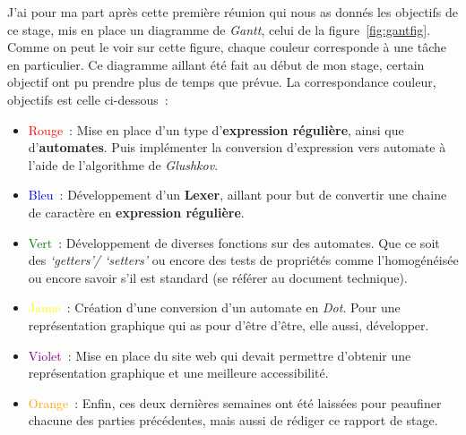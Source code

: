 \vphantom{}

J'ai pour ma part après cette première réunion qui nous as donnés les objectifs
de ce stage, mis en place un diagramme de \textit{Gantt}, celui de la 
figure~\ref{fig:gantfig}. Comme on peut le voir sur cette figure, chaque couleur 
corresponde à une tâche en particulier. Ce diagramme aillant été fait au début 
de mon stage, certain objectif ont pu prendre plus de temps que prévue. La 
correspondance couleur, objectifs est celle ci-dessous~:

\vphantom{}

\begin{itemize}
  \item[\textbullet] \textcolor{red}{Rouge}~: Mise en place d'un type 
  d'\textbf{expression régulière}, ainsi que d'\textbf{automates}. Puis 
  implémenter la conversion d'expression vers automate à l'aide de l'algorithme 
  de \textit{Glushkov}.
  \item[\textbullet] \textcolor{blue}{Bleu}~: Développement d'un \textbf{Lexer}, 
  aillant pour but de convertir une chaine de caractère en \textbf{expression 
  régulière}.
  \item[\textbullet] \textcolor{green}{Vert}~: Développement de diverses 
  fonctions sur des automates. Que ce soit des \textit{`getters'/ `setters'} ou 
  encore des tests de propriétés comme l'homogénéisée ou encore savoir s'il 
  est standard (se référer au document technique).
  \item[\textbullet] \textcolor{yellow}{Jaune}~: Création d'une conversion d'un
  automate en \textit{Dot}. Pour une représentation graphique qui as pour d'être 
  d'être, elle aussi, développer.
  \item[\textbullet] \textcolor{purple}{Violet}~: Mise en place du site web qui 
  devait permettre d'obtenir une représentation graphique et une meilleure 
  accessibilité.
  \item[\textbullet] \textcolor{orange}{Orange}~: Enfin, ces deux dernières 
  semaines ont été laissées pour peaufiner chacune des parties précédentes, mais 
  aussi de rédiger ce rapport de stage.
\end{itemize}

